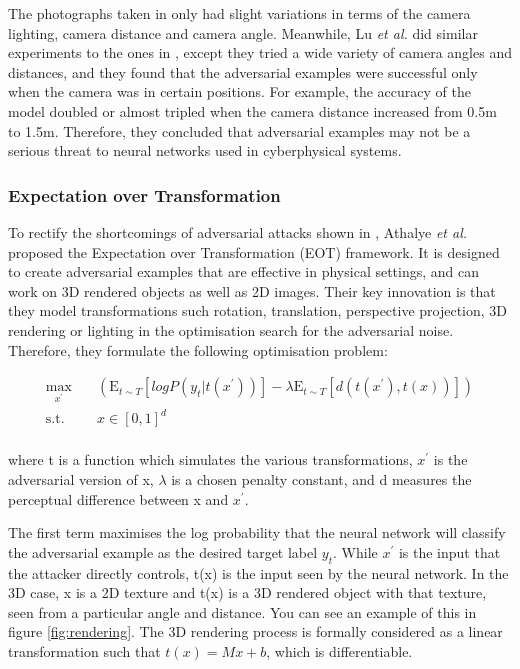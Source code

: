 \documentclass[11pt, a4paper, oneside]{article}
\begin{document}
The photographs taken in \cite{kurakin2016adversarial} only had slight variations in terms of the camera lighting, camera distance and camera angle. Meanwhile, Lu \textit{et al.} \cite{lu_physical_experiments} did similar experiments to the ones in \cite{kurakin2016adversarial}, except they tried a wide variety of camera angles and distances, and they found that the adversarial examples were successful only when the camera was in certain positions. For example, the accuracy of the model doubled or almost tripled when the camera distance increased from 0.5m to 1.5m. Therefore, they concluded that adversarial examples may not be a serious threat to neural networks used in cyberphysical systems.

\subsubsection{Expectation over Transformation}
    \label{subsubsec:eot}

To rectify the shortcomings of adversarial attacks shown in \cite{lu_physical_experiments}, Athalye \textit{et al.} \cite{athalye} proposed the Expectation over Transformation (EOT) framework. It is designed to create adversarial examples that are effective in physical settings, and can work on 3D rendered objects as well as 2D images. Their key innovation is that they model transformations such rotation, translation, perspective projection, 3D rendering or lighting in the optimisation search for the adversarial noise. Therefore, they formulate the following optimisation problem:

\begin{equation}
\begin{aligned}
\max_{x^\prime} \quad & (\mathrm{E}_{t\sim T}[log P(y_{t} | t(x^\prime))] - \lambda \mathrm{E}_{t\sim T}[d(t(x^\prime), t(x))])\\
\textrm{s.t.} \quad & x \in [0, 1]^d   \\
\end{aligned}
\end{equation}

\noindent where t is a function which simulates the various transformations, $x^\prime$ is the adversarial version of x, $\lambda$ is a chosen penalty constant, and d measures the perceptual difference between x and $x^\prime$. 

The first term maximises the log probability that the neural network will classify the adversarial example as the desired target label $y_{t}$. While $x^\prime$ is the input that the attacker directly controls, t(x) is the input seen by the neural network. In the 3D case, x is a 2D texture and t(x) is a 3D rendered object with that texture, seen from a particular angle and distance. You can see an example of this in figure \ref{fig:rendering}. The 3D rendering process is formally considered as a linear transformation such that $t(x) = Mx + b$, which is differentiable.
\end{document}
